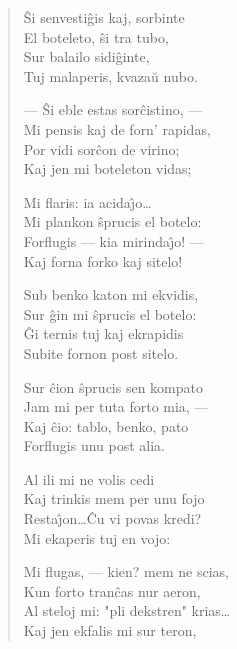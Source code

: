 \begin{verse}
                        \^Si senvesti\^gis kaj, sorbinte\\
                        El boteleto, \^si tra tubo,\\
                        Sur balailo sidi\^ginte,\\
                        Tuj malaperis, kvaza\u u nubo.

                         \vin     --- \^Si eble estas sor\^cistino, ---\\
                         \vin     Mi pensis kaj de forn' rapidas,\\
                         \vin     Por vidi sor\^con de virino;\\
                         \vin     Kaj jen mi boteleton vidas;

                        Mi flaris: ia acida\^{\j}o\dots\\
                        Mi plankon \^sprucis el botelo:\\
                        Forflugis --- kia mirinda\^{\j}o! ---\\
                        Kaj forna forko kaj sitelo!

                         \vin     Sub benko katon mi ekvidis,\\
                         \vin     Sur \^gin mi \^sprucis el botelo:\\
                         \vin     \^Gi ternis tuj kaj ekrapidis\\
                         \vin     Subite fornon post sitelo.

                        Sur \^cion \^sprucis sen kompato\\
                        Jam mi per tuta forto mia, ---\\
                        Kaj \^cio: tablo, benko, pato\\
                        Forflugis unu post alia.

                         \vin     Al ili mi ne volis cedi\\
                          \vin    Kaj trinkis mem per unu fojo\\
                         \vin     Resta\^{\j}on\dots \^Cu vi povas kredi?\\
                         \vin     Mi ekaperis tuj en vojo:

                        Mi flugas, --- kien? mem ne scias,\\
                        Kun forto tran\^cas nur aeron,\\
                        Al steloj mi: "pli dekstren" krias\dots\\
                        Kaj jen ekfalis mi sur teron,


\end{verse}
